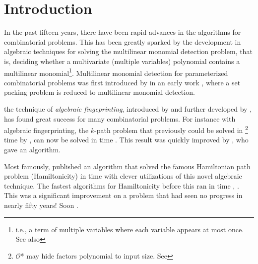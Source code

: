 
\section{Introduction}

In the past fifteen years, 
there have been rapid advances in the algorithms for combinatorial problems. 
This has been greatly sparked by the development in algebraic techniques for solving the 
multilinear monomial detection problem, that is, 
deciding whether a multivariate (multiple variables) 
polynomial contains a multilinear monomial\footnote{ 
i.e., a term of multiple variables where each variable appears at most once. 
See also }. 
Multilinear monomial detection for parameterized combinatorial problems was 
first introduced by \citeauthor{Koutis05} in an early work 
\cite{Koutis05}, where a set packing problem is 
reduced to multilinear monomial detection.

 the technique of \emph{algebraic fingeprinting},   
introduced by \textcite{Koutis08} and further developed by 
\textcite{Williams09}, 
has found great success for many combinatorial problems. 
For instance with algebraic fingerprinting, the $k$-path problem 
that previously could be solved in
\footnote{$\mathcal{O}$* may hide factors polynomial to input size. 
See } 
time by \textcite{Chen07}, 
can now be solved in  time \cite{Koutis08}. 
This result was quickly improved by \textcite{Williams09}, 
who gave an  algorithm.

Most famously, 
\textcite{Björklund14} published an algorithm 
that solved the famous Hamiltonian path problem (Hamiltonicity) in  time 
with clever utilizations of this novel algebraic technique. 
The fastest algorithms for Hamiltonicity before this ran in  time
\cite{HelKar62}, \cite{Bellman62}. 
This was a significant improvement on a problem 
that had seen no progress in nearly fifty years! 
Soon
 \cite{Björklund17}.

